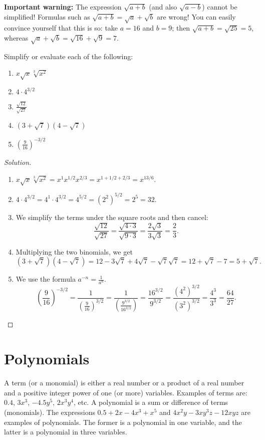 \documentclass{ximera}
\begin{document}
{\bf Important warning:} The expression $\sqrt{a+b}$ (and also $\sqrt{a-b}$) cannot be simplified!  Formulas such as $\sqrt{a+b} = \sqrt{a}+\sqrt{b}$ are wrong!
You can easily convince yourself that this is so: take $a=16$ and $b=9$; then $\sqrt{a+b}=\sqrt{25}=5$, whereas $\sqrt{a}+\sqrt{b} = \sqrt{16}+\sqrt{9}=7$.

\begin{example}Simplify or evaluate each of the following:
\begin{enumerate}
	\item $x \sqrt{x} \sqrt[3]{x^2}$
	\item $4 \cdot 4^{3/2}$
	\item $\frac{\sqrt{12}}{\sqrt{27}}$
	\item $\left(3+\sqrt{7}\right)\left(4-\sqrt{7}\right)$
	\item $\left(\frac{9}{16}\right)^{-3/2}$
\end{enumerate}
\end{example}

\begin{proof}[Solution]
\begin{enumerate}
	\item{ $\displaystyle x\sqrt{x}\sqrt[3]{x^2} = x^1 x^{1/2} x^{2/3} = x^{1+1/2+2/3} = x^{13/6}$.}
	\item{ $4 \cdot 4^{3/2} = 4^1 \cdot 4^{3/2} = 4^{5/2} = \left(2^2\right)^{5/2} = 2^5 = 32$.}
	\item{ We simplify the terms under the square roots and then cancel:
		\[\frac{\sqrt{12}}{\sqrt{27}} = \frac{\sqrt{4\cdot 3}}{\sqrt{9\cdot 3}} = \frac{2\sqrt{3}}{3\sqrt{3}} = \frac{2}{3}.\] }
	\item{ Multiplying the two binomials, we get
		\[ \left(3+\sqrt{7}\right)\left(4-\sqrt{7}\right) = 12 - 3\sqrt{7} + 4\sqrt{7} - \sqrt{7}\sqrt{7} = 12 + \sqrt{7}-7 = 5+\sqrt{7}.\]}
	\item{ We use the formula $a^{-n} = \frac{1}{a^n}$.
		\[ \left(\frac{9}{16}\right)^{-3/2} = \frac{1}{\left(\frac{9}{16}\right)^{3/2}} = \frac{1}{\left( \frac{9^{3/2}}{16^{3/2}} \right)}
			= \frac{16^{3/2}}{9^{3/2}} = \frac{\left(4^2\right)^{3/2}}{\left(3^2\right)^{3/2}} = \frac{4^3}{3^3} = \frac{64}{27}.\]}
\end{enumerate}
\end{proof}

\section{Polynomials}
A term (or a monomial) is either a real number or a product of a real number and a positive integer power of one (or more) variables.  Examples of terms are:
$0.4$, $3x^3$, $-4.5y^5$, $2x^3y^4$, etc.  A polynomial is a sum or difference of terms (monomials).  The expressions $0.5 + 2x - 4x^3 + x^5$ and
$4x^2y - 3xy^3z-12xyz$ are examples of polynomials.  The former is a polynomial in one variable, and the latter is a polynomial in three variables.
\end{document}
